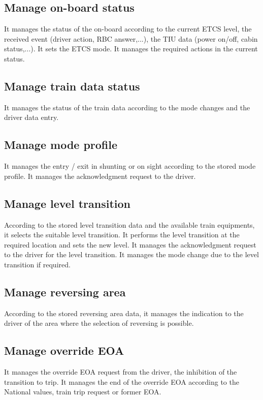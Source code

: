 \documentclass[nocc]{template/openetcs_report}
\begin{document}
\subsection{Manage on-board status}
It manages the status of the on-board according to the current ETCS level, the received event (driver action, RBC answer,...), the TIU data (power on/off, cabin status,...). 
It sets the ETCS mode. 
It manages the required actions in the current status.

\subsection{Manage train data status}
It manages the status of the train data according to the mode changes and the driver data entry.

\subsection{Manage mode profile}
It manages the entry / exit in shunting or on sight according to the stored mode profile. 
It manages the acknowledgment request to the driver.

\subsection{Manage level transition}
According to the stored level transition data and the available train equipments, it selects the suitable level transition. 
It performs the level transition at the required location and sets the new level. 
It manages the acknowledgment request to the driver for the level transition. 
It manages the mode change due to the level transition if required.

\subsection{Manage reversing area}
According to the stored reversing area data, it manages the indication to the driver of the area where the selection of reversing is possible.

\subsection{Manage override EOA}
It manages the override EOA request from the driver, the inhibition of the transition to trip. 
It manages the end of the override EOA according to the National values, train trip request or former EOA.
\end{document}
